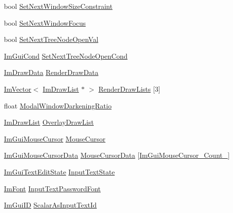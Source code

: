 \begin{DoxyCompactItemize}
bool \mbox{\hyperlink{struct_im_gui_context_a9d2204e10eb23d9ab8aa653b555fb851}{Set\+Next\+Window\+Size\+Constraint}}
\item 
bool \mbox{\hyperlink{struct_im_gui_context_a11a744f855421fedef4adff0cac48bcb}{Set\+Next\+Window\+Focus}}
\item 
bool \mbox{\hyperlink{struct_im_gui_context_aab81a8f92b73046a0277f77fad4dcc85}{Set\+Next\+Tree\+Node\+Open\+Val}}
\item 
\mbox{\hyperlink{imgui_8h_aef890d6ac872e12c5804d0b3e4f7f103}{Im\+Gui\+Cond}} \mbox{\hyperlink{struct_im_gui_context_a2b78c616a3d9d26cfe28c575fe6506dc}{Set\+Next\+Tree\+Node\+Open\+Cond}}
\item 
\mbox{\hyperlink{struct_im_draw_data}{Im\+Draw\+Data}} \mbox{\hyperlink{struct_im_gui_context_a81cacf53454e6dc932a7e3181179a3af}{Render\+Draw\+Data}}
\item 
\mbox{\hyperlink{class_im_vector}{Im\+Vector}}$<$ \mbox{\hyperlink{struct_im_draw_list}{Im\+Draw\+List}} $\ast$ $>$ \mbox{\hyperlink{struct_im_gui_context_a65c7d5bafc5cb52d77d181925ff777da}{Render\+Draw\+Lists}} \mbox{[}3\mbox{]}
\item 
float \mbox{\hyperlink{struct_im_gui_context_ac4088a7de19357cdfeb3ead2d53ffcd8}{Modal\+Window\+Darkening\+Ratio}}
\item 
\mbox{\hyperlink{struct_im_draw_list}{Im\+Draw\+List}} \mbox{\hyperlink{struct_im_gui_context_abc8e0592d9beea307d78661df0a38b1a}{Overlay\+Draw\+List}}
\item 
\mbox{\hyperlink{imgui_8h_a9223d6c82bb5d12c2eab5f829ca520ef}{Im\+Gui\+Mouse\+Cursor}} \mbox{\hyperlink{struct_im_gui_context_ab60730c7f9f601fd0b22dac060a822e3}{Mouse\+Cursor}}
\item 
\mbox{\hyperlink{struct_im_gui_mouse_cursor_data}{Im\+Gui\+Mouse\+Cursor\+Data}} \mbox{\hyperlink{struct_im_gui_context_a244c1b68fdb7da04de90d5becd5a5777}{Mouse\+Cursor\+Data}} \mbox{[}\mbox{\hyperlink{imgui_8h_a2eb1181cc1d7872a061df8731141dde9aa2c8807fa1d95bf43b63b3bd946b3fd0}{Im\+Gui\+Mouse\+Cursor\+\_\+\+Count\+\_\+}}\mbox{]}
\item 
\mbox{\hyperlink{struct_im_gui_text_edit_state}{Im\+Gui\+Text\+Edit\+State}} \mbox{\hyperlink{struct_im_gui_context_ae8626ef18bc5a848691a0c50e2c0f7ae}{Input\+Text\+State}}
\item 
\mbox{\hyperlink{struct_im_font}{Im\+Font}} \mbox{\hyperlink{struct_im_gui_context_a6aa67b9b778bd741d9866ec34cc8ee8b}{Input\+Text\+Password\+Font}}
\item 
\mbox{\hyperlink{imgui_8h_a1785c9b6f4e16406764a85f32582236f}{Im\+Gui\+ID}} \mbox{\hyperlink{struct_im_gui_context_af7d6712f53762d620c4d4dac89dbc222}{Scalar\+As\+Input\+Text\+Id}}

\end{DoxyCompactItemize}
